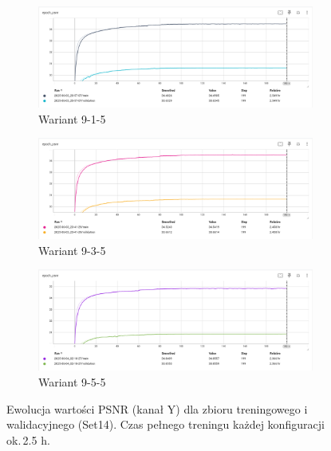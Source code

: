 \documentclass[11pt]{article}
\begin{document}
\begin{figure}[H]
\centering
\captionsetup[subfigure]{justification=centering}

\begin{subfigure}{\linewidth}
  \centering
  \includegraphics[width=.9\linewidth]{images/9_1_5.png}  
  \caption{Wariant 9-1-5}
\end{subfigure}

\medskip   

\begin{subfigure}{\linewidth}
  \centering
  \includegraphics[width=.9\linewidth]{images/9_3_5.png}
  \caption{Wariant 9-3-5}
\end{subfigure}

\medskip

\begin{subfigure}{\linewidth}
  \centering
  \includegraphics[width=.9\linewidth]{images/9_5_5.png}
  \caption{Wariant 9-5-5}
\end{subfigure}

\caption{Ewolucja wartości PSNR (kanał Y) dla zbioru treningowego
i walidacyjnego (Set14).  Czas pełnego treningu każdej konfiguracji
ok.\,2.5 h.}
\label{fig:psnr_curves}
\end{figure}
\end{document}
